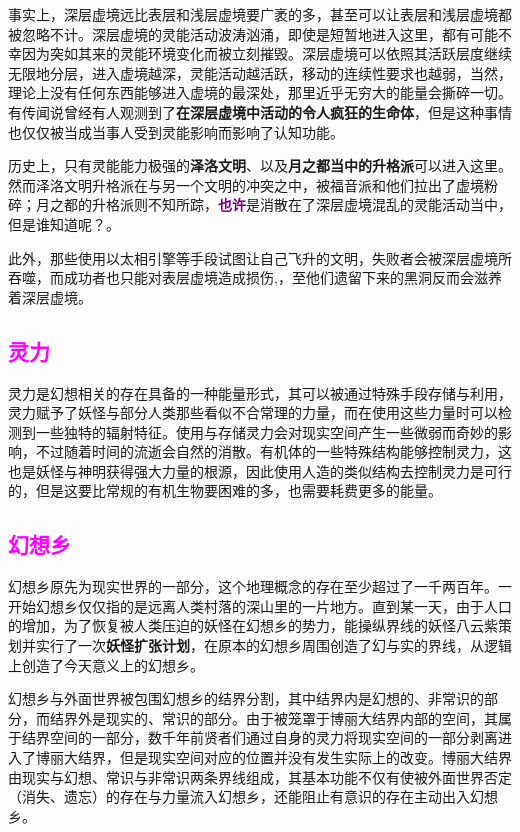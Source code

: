\documentclass[10.5pt,compsoc,UTF8]{CjC}
\theoremstyle{mystyle}
\begin{document}
{事实上，深层虚境远比表层和浅层虚境要广袤的多，甚至可以让表层和浅层虚境都被忽略不计。深层虚境的灵能活动波涛汹涌，即使是短暂地进入这里，都有可能不幸因为突如其来的灵能环境变化而被立刻摧毁。深层虚境可以依照其活跃层度继续无限地分层，进入虚境越深，灵能活动越活跃，移动的连续性要求也越弱，当然，理论上没有任何东西能够进入虚境的最深处，那里近乎无穷大的能量会撕碎一切。有传闻说曾经有人观测到了\textbf{在深层虚境中活动的令人疯狂的生命体}，但是这种事情也仅仅被当成当事人受到灵能影响而影响了认知功能。

历史上，只有灵能能力极强的\textbf{泽洛文明}、以及\textbf{月之都当中的升格派}可以进入这里。然而泽洛文明升格派在与另一个文明的冲突之中，被福音派和他们拉出了虚境粉碎；月之都的升格派则不知所踪，\textbf{\textcolor{purple}{也许}}是消散在了深层虚境混乱的灵能活动当中，但是谁知道呢？。

此外，那些使用以太相引擎等手段试图让自己飞升的文明，失败者会被深层虚境所吞噬，而成功者也只能对表层虚境造成损伤,，至他们遗留下来的黑洞反而会滋养着深层虚境。

\subsection{\textcolor{magenta}{灵力}}

灵力是幻想相关的存在具备的一种能量形式，其可以被通过特殊手段存储与利用，灵力赋予了妖怪与部分人类那些看似不合常理的力量，而在使用这些力量时可以检测到一些独特的辐射特征。使用与存储灵力会对现实空间产生一些微弱而奇妙的影响，不过随着时间的流逝会自然的消散。有机体的一些特殊结构能够控制灵力，这也是妖怪与神明获得强大力量的根源，因此使用人造的类似结构去控制灵力是可行的，但是这要比常规的有机生物要困难的多，也需要耗费更多的能量。

\subsection{\textcolor{magenta}{幻想乡}}

幻想乡原先为现实世界的一部分，这个地理概念的存在至少超过了一千两百年。一开始幻想乡仅仅指的是远离人类村落的深山里的一片地方。直到某一天，由于人口的增加，为了恢复被人类压迫的妖怪在幻想乡的势力，能操纵界线的妖怪八云紫策划并实行了一次\textbf{妖怪扩张计划}，在原本的幻想乡周围创造了幻与实的界线，从逻辑上创造了今天意义上的幻想乡。

幻想乡与外面世界被包围幻想乡的结界分割，其中结界内是幻想的、非常识的部分，而结界外是现实的、常识的部分。由于被笼罩于博丽大结界内部的空间，其属于结界空间的一部分，数千年前贤者们通过自身的灵力将现实空间的一部分剥离进入了博丽大结界，但是现实空间对应的位置并没有发生实际上的改变。博丽大结界由现实与幻想、常识与非常识两条界线组成，其基本功能不仅有使被外面世界否定（消失、遗忘）的存在与力量流入幻想乡，还能阻止有意识的存在主动出入幻想乡。

}
\end{document}

